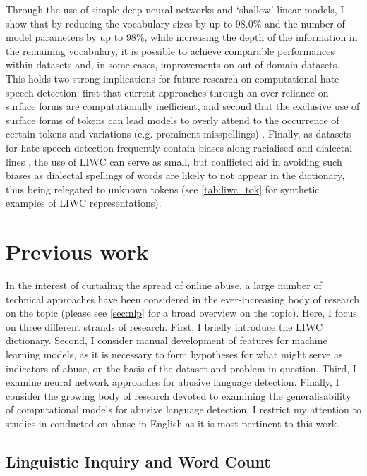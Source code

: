 Through the use of simple deep neural networks and `shallow' linear models, I show that by reducing the vocabulary sizes by up to $98.0\%$ and the number of model parameters by up to $98\%$, while increasing the depth of the information in the remaining vocabulary, it is possible to achieve comparable performances within datasets and, in some cases, improvements on out-of-domain datasets. This holds two strong implications for future research on computational hate speech detection: first that current approaches through an over-reliance on surface forms are computationally inefficient, and second that the exclusive use of surface forms of tokens can lead models to overly attend to the occurrence of certain tokens and variations (e.g. prominent misspellings) \citep{Rottger:2021}. Finally, as datasets for hate speech detection frequently contain biases along racialised and dialectal lines \citep{Waseem:2018,Davidson:2019}, the use of LIWC can serve as small, but conflicted aid in avoiding such biases as dialectal spellings of words are likely to not appear in the dictionary, thus being relegated to unknown tokens (see \cref{tab:liwc_tok} for synthetic examples of LIWC representations).

\section{Previous work}

In the interest of curtailing the spread of online abuse, a large number of technical approaches have been considered in the ever-increasing body of research on the topic (please see \cref{sec:nlp} for a broad overview on the topic). Here, I focus on three different strands of research. First, I briefly introduce the LIWC dictionary. Second, I consider manual development of features for machine learning models, as it is necessary to form hypotheses for what might serve as indicators of abuse, on the basis of the dataset and problem in question. Third, I examine neural network approaches for abusive language detection. Finally, I consider the growing body of research devoted to examining the generalisability of computational models for abusive language detection. I restrict my attention to studies in conducted on abuse in English as it is most pertinent to this work.

\subsection{Linguistic Inquiry and Word Count}

